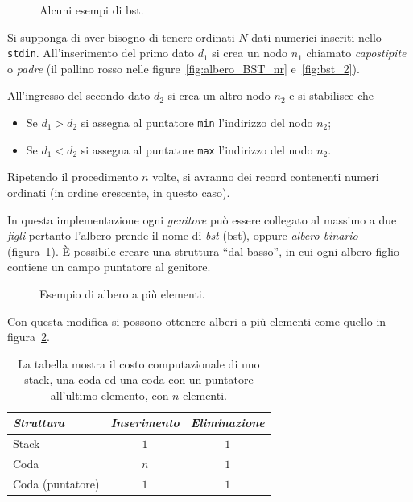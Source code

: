 \begin{figure}
	\centering
{}\quad
{}
	\caption{Alcuni esempi di \acs{bst}.}
	\label{fig:bst}
\end{figure}
Si supponga di aver bisogno di tenere ordinati $N$ dati numerici inseriti nello \lstinline!stdin!.
All'inserimento del primo dato $d_1$ si crea un nodo $n_1$ chiamato \emph{capostipite} o \emph{padre} (il pallino rosso nelle figure~\ref{fig:albero_BST_nr} e~\ref{fig:bst_2}).


All'ingresso del secondo dato $d_2$ si crea un altro nodo $n_2$ e si stabilisce che
\begin{itemize}
	\item
Se $d_1>d_2$ si assegna al puntatore \lstinline!min! l'indirizzo del nodo $n_2$;
	\item
Se $d_1<d_2$ si assegna al puntatore \lstinline!max! l'indirizzo del nodo $n_2$.
\end{itemize}
Ripetendo il procedimento $n$ volte, si avranno dei record contenenti numeri ordinati (in ordine crescente, in questo caso).


In questa implementazione ogni \emph{genitore} può essere collegato al massimo a due \emph{figli} pertanto l'albero prende il nome di \emph{\acl{bst}} {\small(\acs{bst})}, oppure \emph{albero binario} (figura~\ref{fig:bst}).
\`E possibile creare una struttura ``dal basso'', in cui ogni albero figlio contiene un campo puntatore al genitore.
\begin{figure}
	\centering

	\caption{Esempio di albero a più elementi.}
	\label{fig:+el-tree}
\end{figure}
Con questa modifica si possono ottenere alberi a più elementi come quello in figura~\ref{fig:+el-tree}.

\begin{table}
	\centering
	\caption[Costo computazionale]{La tabella mostra il costo computazionale di uno stack, una coda ed una coda con un puntatore all'ultimo elemento, con $n$ elementi.}
	\label{tab:co-st}
	\begin{tabular}{l | c c}
		\toprule
\emph{Struttura}		&\emph{Inserimento}	&\emph{Eliminazione}	\\
		\midrule
	Stack			&$1$				&$1$				\\
	Coda			&$n$				&$1$				\\
	Coda (puntatore)	&$1$				&$1$
	\end{tabular}
\end{table}

